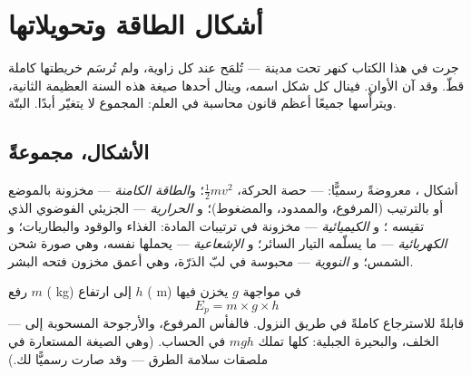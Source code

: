 \chapter{أشكال الطاقة وتحويلاتها}\label{ch:g9:energy-conversions}

جرت  في هذا الكتاب كنهر تحت مدينة --- تُلمَح عند كل زاوية،
ولم تُرسَم خريطتها كاملة قطّ. وقد آن الأوان. فينال كل شكل
اسمه، وينال أحدها صيغة هذه السنة العظيمة الثانية، ويترأّسها
جميعًا أعظم قانون محاسبة في العلم: المجموع لا يتغيّر أبدًا.
البتّة.

\section{الأشكال، مجموعةً}

\begin{definition}\label{def:g9:energy-conversions:forms}
أشكال ، معروضةً رسميًّا: \emph{} --- حصة
الحركة، $\frac12 m v^2$؛ و\emph{الطاقة الكامنة} --- مخزونة بالموضع أو بالترتيب (المرفوع، والممدود،
والمضغوط)؛ و\emph{ الحرارية} ---  الجزيئي
الفوضوي الذي تقيسه ؛ و\emph{ الكيميائية} ---
مخزونة في ترتيبات المادة: الغذاء والوقود والبطاريات؛
و\emph{ الكهربائية} --- ما يسلّمه التيار السائر؛
و\emph{ الإشعاعية} --- يحملها  نفسه، وهي صورة شحن
 الشمس؛ و\emph{ النووية} --- محبوسة في لبّ الذرّة،
وهي أعمق مخزون فتحه البشر.
\end{definition}

\begin{proposition}\label{prop:g9:energy-conversions:ep}
رفع  $m$ ( \unit{kg}) إلى ارتفاع $h$ (
\unit{m}) في مواجهة $g$  يخزن فيها 
\[
E_p = m \times g \times h
\]
 --- قابلةً للاسترجاع كاملةً في طريق النزول. فالفأس
المرفوع، والأرجوحة المسحوبة إلى الخلف، والبحيرة الجبلية: كلها
تملك $m g h$ في الحساب. (وهي الصيغة المستعارة في ملصقات سلامة
الطرق --- وقد صارت رسميًّا لك.)
\end{proposition}

